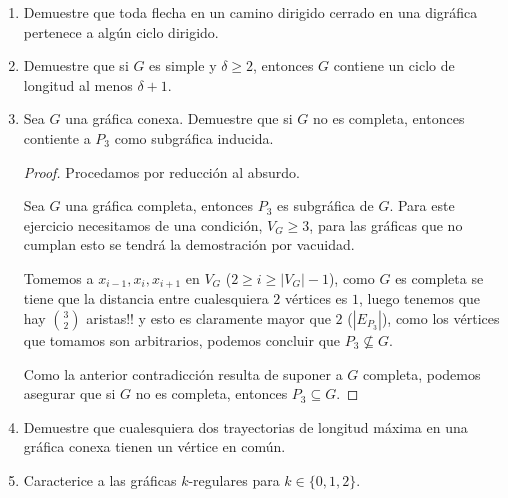 \documentclass{article}
\begin{document}
\begin{enumerate}
  \small
\item Demuestre que toda flecha en un camino dirigido cerrado en una  digr\'afica
  pertenece a alg\'un ciclo dirigido.
\item Demuestre que si $G$ es simple y $\delta \ge 2$, entonces $G$ contiene
  un ciclo de longitud al menos $\delta + 1$.
\item Sea $G$ una gr\'afica conexa.   Demuestre que si $G$ no es completa,
  entonces contiente a $P_3$ como subgr\'afica inducida.
  \renewcommand\qedsymbol{QED}
  \begin{proof}
    Procedamos por reducción al absurdo.

    Sea $G$ una gráfica completa, entonces $P_{3}$ es subgráfica de $G$. Para este
    ejercicio necesitamos de una condición, $V_G \ge 3$, para las gráficas que no
    cumplan esto se tendrá la demostración por vacuidad.

    Tomemos a $x_{i - 1}, x_{i}, x_{i + 1}$ en $V_{G}$ ($2 \ge i \ge
    |V_{G}| - 1$), como $G$ es completa se tiene que la distancia entre cualesquiera
    $2$ v\'ertices es $1$, luego tenemos que hay ${3 \choose 2}$ aristas!! y esto es
    claramente mayor que $2$ ($|E_{P_3}|$), como los v\'ertices que tomamos son arbitrarios,
    podemos concluir que $P_{3} \nsubseteq G$.
    
    Como la anterior contradicci\'on resulta de suponer a $G$ completa, podemos
    asegurar que si $G$ no es completa, entonces $P_3 \subseteq G$.
  \end{proof}
\item Demuestre que cualesquiera dos trayectorias de longitud m\'axima en una
  gr\'afica conexa tienen un vértice en común.
\item Caracterice a las gr\'aficas $k$-regulares para $k \in \{ 0, 1, 2 \}$.
  

\end{enumerate}
\end{document}
